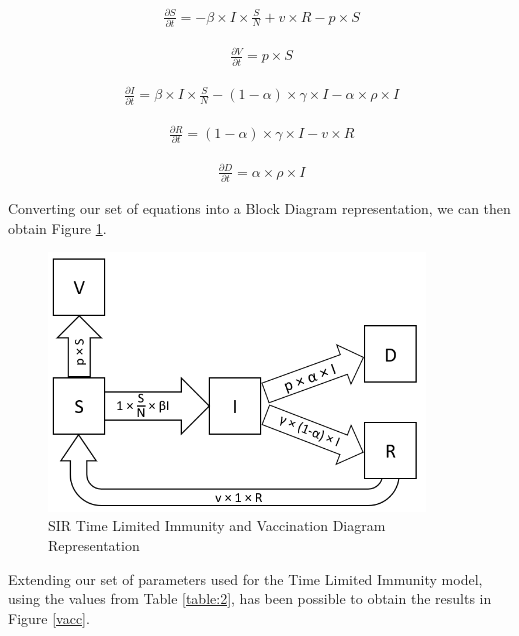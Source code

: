 \useshortskip
\begin{align}
\ \frac{\partial S}{\partial t} = -\beta \times I \times \frac{S}{N} + v \times R - p \times S
\end{align}
\useshortskip

\useshortskip
\begin{align}
\ \frac{\partial V}{\partial t} = p \times S
\end{align}
\useshortskip

\useshortskip
\begin{align}
\ \frac{\partial I}{\partial t} = \beta \times I \times \frac{S}{N}  -(1-\alpha) \times \gamma \times I -\alpha \times \rho \times I
\end{align}
\useshortskip

\useshortskip
\begin{align}
\ \frac{\partial R}{\partial t} = (1-\alpha) \times \gamma \times I - v \times R
\end{align}
\useshortskip

\useshortskip
\begin{align}
\ \frac{\partial D}{\partial t} = \alpha \times \rho \times I
\end{align}
\useshortskip

Converting our set of equations into a Block Diagram representation, we can then obtain Figure \ref{dvacc}.

\begin{figure}[ht!]%
    \centering
    \includegraphics[width=10cm]{latex/images/dvacc.PNG}%
    \caption{SIR Time Limited Immunity and Vaccination Diagram Representation}
    \label{dvacc}
\end{figure}


Extending our set of parameters used for the Time Limited Immunity model, using the values from Table \ref{table:2}, has been possible to obtain the results in Figure \ref{vacc}.

